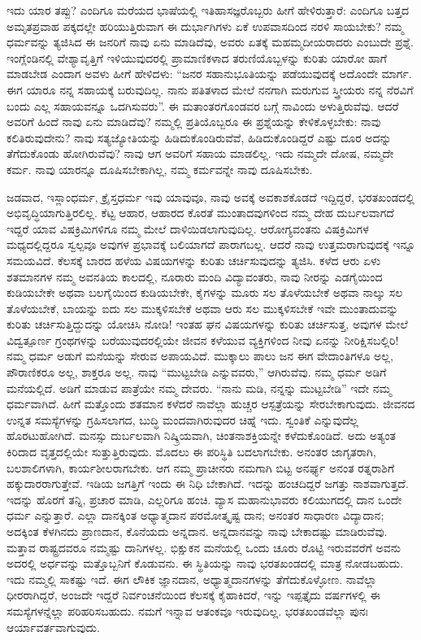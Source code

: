 ಇದು ಯಾರ ತಪ್ಪು? ಎಂದಿಗೂ ಮರೆಯದ ಭಾಷೆಯಲ್ಲಿ ಇತಿಹಾಸಜ್ಞರೊಬ್ಬರು ಹೀಗೆ ಹೇಳಿರುತ್ತಾರೆ: ಎಂದಿಗೂ ಬತ್ತದ ಅಮೃತಪ್ರವಾಹ ಪಕ್ಕದಲ್ಲೇ ಹರಿಯುತ್ತಿರುವಾಗ ಈ ದುರ್ಭಾಗಿಗಳು ಏಕೆ ಉಪವಾಸದಿಂದ ನರಳಿ ಸಾಯಬೇಕು? ನಮ್ಮ ಧರ್ಮವನ್ನು ತ್ಯಜಿಸಿದ ಈ ಜನರಿಗೆ ನಾವು ಏನು ಮಾಡಿದೆವು, ಅವರು ಏತಕ್ಕೆ ಮಹಮ್ಮದೀಯರಾದರು ಎಂಬುದೇ ಪ್ರಶ್ನೆ. ಇಂಗ್ಲೆಂಡಿನಲ್ಲಿ ವೇಶ್ಯಾವೃತ್ತಿಗೆ ಇಳಿಯುವುದರಲ್ಲಿ ಪ್ರಾಮಾಣಿಕಳಾದ ತರುಣಿಯೊಬ್ಬಳನ್ನು ಕುರಿತು ಯಾರೋ ಹಾಗೆ ಮಾಡಬೇಡ ಎಂದಾಗ ಅವಳು ಹೀಗೆ ಹೇಳಿದಳು: “ಜನರ ಸಹಾನುಭೂತಿಯನ್ನು ಪಡೆಯುವುದಕ್ಕೆ ಅದೊಂದೇ ಮಾರ್ಗ. ಈಗ ಯಾರೂ ನನ್ನ ಸಹಾಯಕ್ಕೆ ಬರುವುದಿಲ್ಲ. ನಾನು ಪತಿತಳಾದ ಮೇಲೆ ನನಗಾಗಿ ಮರುಗುವ ಸ್ತ್ರೀಯರು ನನ್ನ ನೆರವಿಗೆ ಬಂದು ಎಲ್ಲ ಸಹಾಯವನ್ನೂ ಒದಗಿಸುವರು”. ಈ ಮತಾಂತರಗೊಂಡವರ ಬಗ್ಗೆ ನಾವಿಂದು ಅಳುತ್ತಿರುವೆವು. ಆದರೆ ಅವರಿಗೆ ಹಿಂದೆ ನಾವು ಏನು ಮಾಡಿದೆವು? ನಮ್ಮಲ್ಲಿ ಪ್ರತಿಯೊಬ್ಬರೂ ಈ ಪ್ರಶ್ನೆಯನ್ನು ಕೇಳಿಕೊಳ್ಳಬೇಕು: ನಾವು ಕಲಿತಿರುವುದೇನು? ನಾವು ಸತ್ಯಜ್ಯೋತಿಯನ್ನು ಹಿಡಿದುಕೊಂಡಿರುವೆವೆ, ಹಿಡಿದುಕೊಂಡಿದ್ದರೆ ಎಷ್ಟು ದೂರ ಅದನ್ನು ತೆಗೆದುಕೊಂಡು ಹೋಗಿರುವೆವು? ನಾವು ಆಗ ಅವರಿಗೆ ಸಹಾಯ ಮಾಡಲಿಲ್ಲ. ಇದು ನಮ್ಮದೇ ದೋಷ, ನಮ್ಮದೇ ಕರ್ಮ. ನಾವು ಯಾರನ್ನೂ ದೂಷಿಸಬೇಕಾಗಿಲ್ಲ, ನಮ್ಮ ಕರ್ಮವನ್ನೇ ನಾವು ದೂಷಿಸಬೇಕು. 

ಜಡವಾದ, ಇಸ್ಲಾಂಧರ್ಮ, ಕ್ರೈಸ್ತಧರ್ಮ ಇವು ಯಾವುವೂ, ನಾವು ಅವಕ್ಕೆ ಅವಕಾಶಕೊಡದೆ ಇದ್ದಿದ್ದರೆ, ಭರತಖಂಡದಲ್ಲಿ ಅಭಿವೃದ್ಧಿಯಾಗುತ್ತಿರಲಿಲ್ಲ. ಕೆಟ್ಟ ಆಹಾರ, ಆಹಾರದ ಕೊರತೆ ಮುಂತಾದವುಗಳಿಂದ ನಮ್ಮ ದೇಹ ದುರ್ಬಲವಾಗದೆ ಇದ್ದರೆ ಯಾವ ವಿಷಕ್ರಿಮಿಗಳಿಗೂ ನಮ್ಮ ಮೇಲೆ ದಾಳಿಯಿಡಲಾಗುವುದಿಲ್ಲ. ಆರೋಗ್ಯವಂತನು ವಿಷಕ್ರಿಮಿಗಳ ಮಧ್ಯದಲ್ಲಿದ್ದರೂ ಸ್ವಲ್ಪವೂ ಅವುಗಳ ಪ್ರಭಾವಕ್ಕೆ ಬಲಿಯಾಗದೆ ಪಾರಾಗಬಲ್ಲ. ಆದರೆ ನಾವು ಉತ್ತಮರಾಗುವುದಕ್ಕೆ ಇನ್ನೂ ಸಮಯವಿದೆ. ಕೆಲಸಕ್ಕೆ ಬಾರದ ಹಳೆಯ ವಿಷಯಗಳನ್ನು ಕುರಿತು ಚರ್ಚಿಸುವುದನ್ನು ತ್ಯಜಿಸಿ. ಕಳೆದ ಆರು ಏಳು ಶತಮಾನಗಳ ನಮ್ಮ ಅವನತಿಯ ಕಾಲದಲ್ಲಿ, ನೂರಾರು ಮಂದಿ ವಿದ್ಯಾವಂತರು, ನಾವು ನೀರನ್ನು ಎಡಗೈಯಿಂದ ಕುಡಿಯಬೇಕೇ ಅಥವಾ ಬಲಗೈಯಿಂದ ಕುಡಿಯಬೇಕೇ, ಕೈಗಳನ್ನು ಮೂರು ಸಲ ತೊಳೆಯಬೇಕೆ ಅಥವಾ ನಾಲ್ಕು ಸಲ ತೊಳೆಯಬೇಕೆ, ಬಾಯನ್ನು ಐದು ಸಲ ಮುಕ್ಕಳಿಸಬೇಕೆ ಅಥವಾ ಆರು ಸಲ ಮುಕ್ಕಳಿಸಬೇಕೆ ಇವೇ ಮುಂತಾದುವನ್ನು ಕುರಿತು ಚರ್ಚಿಸುತ್ತಿದ್ದುದನ್ನು ಯೋಚಿಸಿ ನೋಡಿ! ಇಂತಹ ಘನ ವಿಷಯಗಳನ್ನು ಕುರಿತು ಚರ್ಚಿಸುತ್ತ, ಅವುಗಳ ಮೇಲೆ ವಿದ್ವತ್ಪೂರ್ಣ ಗ್ರಂಥಗಳನ್ನು ಬರೆಯುವುದರಲ್ಲಿಯೇ ಜೀವನ ಕಳೆಯುವ ವ್ಯಕ್ತಿಗಳಿಂದ ನೀವು ಏನನ್ನು ನೀರಿಕ್ಷಿಸಬಲ್ಲಿರಿ! ನಮ್ಮ ಧರ್ಮ ಅಡುಗೆ ಮನೆಯನ್ನು ಸೇರುವ ಅಪಾಯವಿದೆ. ಮುಕ್ಕಾಲು ಪಾಲು ಜನ ಈಗ ವೇದಾಂತಿಗಳೂ ಅಲ್ಲ, ಪೌರಾಣಿಕರೂ ಅಲ್ಲ, ಶಾಕ್ತರೂ ಅಲ್ಲ. ನಾವು “ಮುಟ್ಟಬೇಡಿ ಎನ್ನುವವರು,” ಆಗಿರುವೆವು. ನಮ್ಮ ಧರ್ಮ ಅಡಿಗೆ ಮನೆಯಲ್ಲಿದೆ. ಅಡಿಗೆ ಮಾಡುವ ಪಾತ್ರೆಯೇ ನಮ್ಮ ದೇವರು. “ನಾನು ಮಡಿ, ನನ್ನನ್ನು ಮುಟ್ಟಬೇಡಿ” ಇದೇ ನಮ್ಮ ಧರ್ಮವಾಗಿದೆ. ಹೀಗೆ ಮತ್ತೊಂದು ಶತಮಾನ ಕಳೆದರೆ ನಾವೆಲ್ಲಾ ಹುಚ್ಚರ ಆಸ್ಪತ್ರೆಯನ್ನು ಸೇರಬೇಕಾಗುವುದು. ಜೀವನದ ಉನ್ನತ ಸಮಸ್ಯೆಗಳನ್ನು ಗ್ರಹಿಸಲಾಗದ, ಬುದ್ಧಿ ಮಂದವಾಗಿರುವುದರ ಚಿಹ್ನೆ ಇದು. ಸ್ವಂತಿಕೆ ಎನ್ನುವುದೆಲ್ಲ ಹೊರಟುಹೋಗಿದೆ. ಮನಸ್ಸು ದುರ್ಬಲವಾಗಿ ನಿಷ್ಕ್ರಿಯವಾಗಿ, ಚಿಂತನಾಶಕ್ತಿಯನ್ನೇ ಕಳೆದುಕೊಂಡಿದೆ. ಅದು ಅತ್ಯಂತ ಕಿರಿದಾದ ವೃತ್ತದಲ್ಲಿಯೇ ಸುತ್ತುತ್ತಿರುವುದು. ಮೊದಲು ಈ ಪರಿಸ್ಥಿತಿ ಬದಲಾಗಬೇಕು. ಅನಂತರ ಜಾಗೃತರಾಗಿ, ಬಲಶಾಲಿಗಳಾಗಿ, ಕಾರ್ಯಶೀಲರಾಗಬೇಕು. ಆಗ ನಮ್ಮ ಪ್ರಾಚೀನರು ನಮಗಾಗಿ ಬಿಟ್ಟ ಅನರ್ಘ್ಯ ಅನಂತ ರತ್ನರಾಶಿಗೆ ಹಕ್ಕುದಾರರಾಗುತ್ತೇವೆ. ಇಡಿಯ ಜಗತ್ತಿಗೆ ಇಂದು ಈ ನಿಧಿ ಬೇಕಾಗಿದೆ. ಇದನ್ನು ಹಂಚದಿದ್ದರೆ ಜಗತ್ತು ನಾಶವಾಗುತ್ತದೆ. ಇದನ್ನು ಹೊರಗೆ ತನ್ನಿ, ಪ್ರಚಾರ ಮಾಡಿ, ಎಲ್ಲರಿಗೂ ಹಂಚಿ. ವ್ಯಾಸ ಮಹಾನುಭಾವರು ಕಲಿಯುಗದಲ್ಲಿ ದಾನ ಒಂದೇ ಧರ್ಮ ಎನ್ನುತ್ತಾರೆ. ಎಲ್ಲಾ ದಾನಕ್ಕಿಂತ ಅಧ್ಯಾತ್ಮದಾನ ಪರಮೋತ್ಕೃಷ್ಟ ದಾನ; ಅನಂತರ ಸಾಧಾರಣ ವಿದ್ಯಾದಾನ; ಅದಕ್ಕಿಂತ ಕೆಳಗಿನದು ಪ್ರಾಣದಾನ, ಕೊನೆಯದು ಅನ್ನದಾನ. ಅನ್ನದಾನವನ್ನು ನಾವು ಬೇಕಾದಷ್ಟು ಮಾಡಿರುವೆವು. ಮತ್ತಾವ ರಾಷ್ಟ್ರದವರೂ ನಮ್ಮಷ್ಟು ದಾನಿಗಳಲ್ಲ. ಭಿಕ್ಷುಕನ ಮನೆಯಲ್ಲಿ ಒಂದು ಚೂರು ರೊಟ್ಟಿ ಇರುವವರೆಗೆ ಅವನು ಅದರಲ್ಲಿ ಅರ್ಧವನ್ನು ಮತ್ತೊಬ್ಬನಿಗೆ ಕೊಡುವನು. ಈ ಸ್ಥಿತಿಯನ್ನು ನಾವು ಭರತಖಂಡದಲ್ಲಿ ಮಾತ್ರ ನೋಡಬಹುದು. ಇದು ನಮ್ಮಲ್ಲಿ ಸಾಕಷ್ಟು ಇದೆ. ಈಗ ಲೌಕಿಕ ಜ್ಞಾನದಾನ, ಅಧ್ಯಾತ್ಮದಾನಗಳನ್ನು ತೆಗೆದುಕೊಳ್ಳೋಣ. ನಾವೆಲ್ಲಾ ಧೀರರಾಗಿದ್ದರೆ, ಅಂಜದೇ ಇದ್ದರೆ ನಿರ್ವಂಚನೆಯಿಂದ ಕೆಲಸಕ್ಕೆ ಕೈಹಾಕಿದರೆ, ಇನ್ನು ಇಪ್ಪತ್ತೈದು ವರ್ಷಗಳಲ್ಲಿ ಈ ಸಮಸ್ಯೆಗಳನ್ನೆಲ್ಲಾ ಪರಿಹರಿಸಬಹುದು. ನಮಗೆ ಇನ್ನಾವ ಆತಂಕವೂ ಇರುವುದಿಲ್ಲ. ಭರತಖಂಡವೆಲ್ಲಾ ಪುನಃ ಆರ್ಯಾವರ್ತವಾಗುವುದು. 

